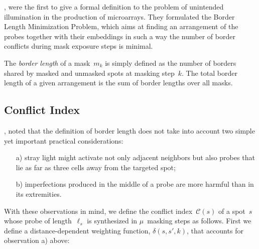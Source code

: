 \documentclass{bioinfo}
\begin{document}
\citealp{HANNENHALLI02}, were the first to give a formal definition to the problem of unintended illumination in the production of microarrays. They formulated the Border Length Minimization Problem, which aims at finding an arrangement of the probes together with their embeddings in such a way the number of border conflicts during mask exposure steps is minimal.

The \emph{border length} of a mask~$m_{k}$ is simply defined as the number of borders shared by masked and unmasked spots at masking step~$k$. The total border length of a given arrangement is the sum of border lengths over all masks.

\subsection{Conflict Index}

\citealp{KAHNG03A}, noted that the definition of border length does not take into account two simple yet important practical considerations:
\begin{itemize}
\item[a)] stray light might activate not only adjacent neighbors but also probes that lie as far as three cells away from the targeted spot;
\item[b)] imperfections produced in the middle of a probe are more harmful than in its extremities.
\end{itemize}

With these observations in mind, we define the conflict index~$\mathcal{C}(s)$ of a spot~$s$ whose probe of length~$\ell_{s}$ is synthesized in $\mu$~masking steps as follows. First we define a distance-dependent weighting function, $\delta(s,s',k)$, that accounts for observation a) above:
\end{document}
